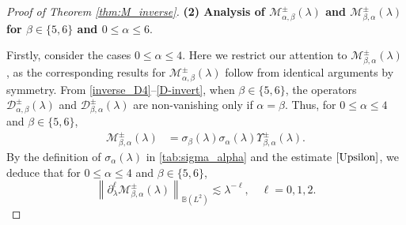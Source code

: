 \documentclass[reqno]{amsart}
\numberwithin{equation}{section}
\begin{document}
\begin{proof}[Proof of Theorem \ref{thm:M_inverse}]
\textbf{(2) Analysis of $\mathcal{M}_{\alpha,\beta}^{\pm}(\lambda)$ and $\mathcal{M}_{\beta,\alpha}^{\pm}(\lambda)$ for $\beta \in \{5,6\}$ and $0 \leq \alpha \leq 6.$}    
	
	Firstly, consider the cases $0 \leq \alpha \leq 4.$    
	Here we restrict our attention to $\mathcal{M}_{\beta,\alpha}^{\pm}(\lambda)$, as the corresponding results for $\mathcal{M}_{\alpha,\beta}^{\pm}(\lambda)$ follow from identical arguments by symmetry.   
	From \eqref{inverse_D4}--\eqref{D-invert}, when $\beta \in \{5,6\}$, the operators $\mathcal{D}_{\alpha,\beta}^\pm(\lambda)$ and $\mathcal{D}_{\beta,\alpha}^\pm(\lambda)$ are non-vanishing only if $\alpha = \beta$. Thus, for $0 \le \alpha \le 4$ and $\beta \in \{5,6\}$,    
	\begin{align*}    
		\mathcal{M}_{\beta,\alpha}^{\pm}(\lambda) &= \sigma_\beta(\lambda) \sigma_\alpha(\lambda) \Upsilon_{\beta,\alpha}^\pm(\lambda).
	\end{align*}    
By the definition of $\sigma_\alpha(\lambda)$ in  \eqref{tab:sigma_alpha} and the estimate $\eqref{Upsilon}$,  we deduce that for $0 \le \alpha \le 4$ and $\beta \in \{5,6\}$,    
	\[  
\left\|\partial_\lambda^\ell \mathcal{M}_{\beta,\alpha}^\pm(\lambda)\right\|_{\mathbb{B}(L^2)} \lesssim \lambda^{-\ell}, \quad \ell = 0, 1, 2.  
\]  
	

\end{proof}
\end{document}
